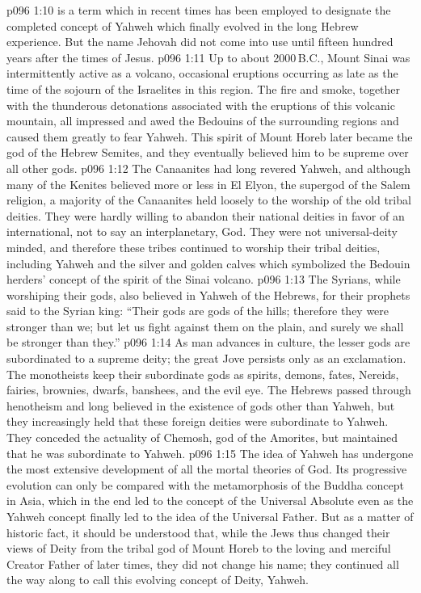 \vs p096 1:10 \pc {} is a term which in recent times has been employed to designate the completed concept of Yahweh which finally evolved in the long Hebrew experience. But the name Jehovah did not come into use until fifteen hundred years after the times of Jesus.
\vs p096 1:11 \pc Up to about 2000\,B.C., Mount Sinai was intermittently active as a volcano, occasional eruptions occurring as late as the time of the sojourn of the Israelites in this region. The fire and smoke, together with the thunderous detonations associated with the eruptions of this volcanic mountain, all impressed and awed the Bedouins of the surrounding regions and caused them greatly to fear Yahweh. This spirit of Mount Horeb later became the god of the Hebrew Semites, and they eventually believed him to be supreme over all other gods.
\vs p096 1:12 The Canaanites had long revered Yahweh, and although many of the Kenites believed more or less in El Elyon, the supergod of the Salem religion, a majority of the Canaanites held loosely to the worship of the old tribal deities. They were hardly willing to abandon their national deities in favor of an international, not to say an interplanetary, God. They were not universal\hyp{}deity minded, and therefore these tribes continued to worship their tribal deities, including Yahweh and the silver and golden calves which symbolized the Bedouin herders’ concept of the spirit of the Sinai volcano.
\vs p096 1:13 The Syrians, while worshiping their gods, also believed in Yahweh of the Hebrews, for their prophets said to the Syrian king: “Their gods are gods of the hills; therefore they were stronger than we; but let us fight against them on the plain, and surely we shall be stronger than they.”
\vs p096 1:14 As man advances in culture, the lesser gods are subordinated to a supreme deity; the great Jove persists only as an exclamation. The monotheists keep their subordinate gods as spirits, demons, fates, Nereids, fairies, brownies, dwarfs, banshees, and the evil eye. The Hebrews passed through henotheism and long believed in the existence of gods other than Yahweh, but they increasingly held that these foreign deities were subordinate to Yahweh. They conceded the actuality of Chemosh, god of the Amorites, but maintained that he was subordinate to Yahweh.
\vs p096 1:15 The idea of Yahweh has undergone the most extensive development of all the mortal theories of God. Its progressive evolution can only be compared with the metamorphosis of the Buddha concept in Asia, which in the end led to the concept of the Universal Absolute even as the Yahweh concept finally led to the idea of the Universal Father. But as a matter of historic fact, it should be understood that, while the Jews thus changed their views of Deity from the tribal god of Mount Horeb to the loving and merciful Creator Father of later times, they did not change his name; they continued all the way along to call this evolving concept of Deity, Yahweh.
